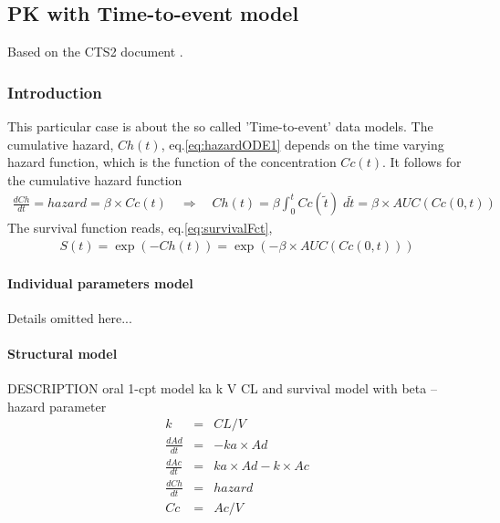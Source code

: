 \subsection{PK with Time-to-event model}
\label{subsec:PKPDTTE}
Based on the CTS2 document \cite{Lavielle:2011}.


\subsubsection{Introduction}
\label{subsec:exp3_intro}

This particular case is about the so called 'Time-to-event' data models. The cumulative hazard, $Ch(t)$, eq.\eqref{eq:hazardODE1} depends on the time varying hazard function, which is the function of the concentration $Cc(t)$. It follows for the cumulative hazard function
\begin{eqnarray}
\frac{dCh}{dt} = hazard = \beta \times Cc(t) \quad \Longrightarrow \quad Ch(t) = \beta \int_0^{t} Cc(\tilde{t}) \;d\tilde{t} = \beta \times AUC(Cc(0,t))  \label{eq:hazardODE1}
\end{eqnarray}
The survival function reads, eq.\eqref{eq:survivalFct},
\begin{eqnarray}
S(t) = \exp(-Ch(t)) = \exp(- \beta \times AUC(Cc(0,t))) \label{eq:survivalFct}
\end{eqnarray}



\paragraph{Individual parameters model}

Details omitted here...

\paragraph{Structural model}
DESCRIPTION oral 1-cpt model ka k V CL and survival model with beta -- hazard parameter
\begin{eqnarray}
k &=& CL/V \nonumber \\
\frac{dAd}{dt} &=&-ka \times Ad \nonumber \\
\frac{dAc}{dt}&=&ka \times Ad - k \times Ac \nonumber \\ 
\frac{dCh}{dt}&=& hazard \nonumber \\ 
Cc &=& Ac/V \nonumber
\end{eqnarray}


